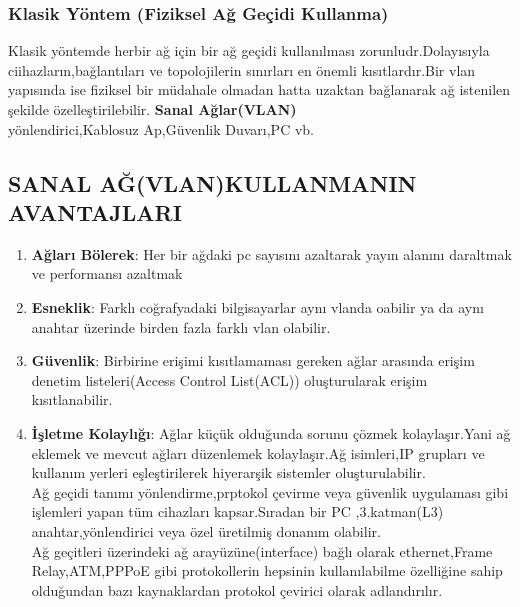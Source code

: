 \subsubsection*{Klasik Yöntem (Fiziksel Ağ Geçidi Kullanma)}
Klasik yöntemde herbir ağ için bir ağ geçidi kullanılması zorunludr.Dolayısıyla ciihazların,bağlantıları ve topolojilerin sınırları en önemli kısıtlardır.Bir vlan yapısında ise fiziksel bir müdahale olmadan hatta uzaktan bağlanarak ağ istenilen şekilde özelleştirilebilir.
\textbf{Sanal Ağlar(VLAN)}\\
yönlendirici,Kablosuz Ap,Güvenlik Duvarı,PC vb.
\subsection*{SANAL AĞ(VLAN)KULLANMANIN AVANTAJLARI}
\begin{enumerate}[label=\alph*)]
    \item \textbf{Ağları Bölerek}: Her bir ağdaki pc sayısını azaltarak yayın alanını daraltmak ve performansı azaltmak
    \item \textbf{Esneklik}: Farklı coğrafyadaki bilgisayarlar aynı vlanda oabilir ya da aynı anahtar üzerinde birden fazla farklı vlan olabilir.
    \item \textbf{Güvenlik}: Birbirine erişimi kısıtlamaması gereken ağlar arasında erişim denetim listeleri(Access Control List(ACL)) oluşturularak erişim kısıtlanabilir.
    \item \textbf{İşletme Kolaylığı}: Ağlar küçük olduğunda sorunu çözmek kolaylaşır.Yani ağ eklemek ve mevcut ağları düzenlemek kolaylaşır.Ağ isimleri,IP grupları ve kullanım yerleri eşleştirilerek hiyerarşik sistemler oluşturulabilir.\\
    Ağ geçidi tanımı yönlendirme,prptokol çevirme veya güvenlik uygulaması gibi işlemleri yapan tüm cihazları kapsar.Sıradan bir PC ,3.katman(L3) anahtar,yönlendirici veya özel üretilmiş donanım olabilir.\\
    Ağ geçitleri üzerindeki ağ arayüzüne(interface) bağlı olarak ethernet,Frame Relay,ATM,PPPoE gibi protokollerin hepsinin kullanılabilme özelliğine sahip olduğundan bazı kaynaklardan protokol çevirici olarak adlandırılır.
\end{enumerate}
